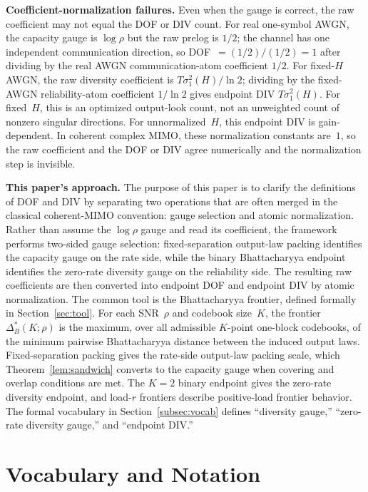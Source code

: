 \documentclass[lettersize,onecolumn]{IEEEtran}
\newcommand{\snr}{\rho}
\begin{document}
\textbf{Coefficient-normalization failures.}
Even when the gauge is correct, the raw coefficient may not equal the
DOF or DIV count. For real one-symbol AWGN, the capacity gauge is
$\log\snr$ but the raw prelog is $1/2$; the channel has one
independent communication direction, so DOF~$= (1/2)/(1/2) = 1$
after dividing by the real AWGN communication-atom coefficient $1/2$.
For fixed-$H$ AWGN, the raw diversity
coefficient is $T\sigma_1^2(H)/\ln 2$; dividing by the fixed-AWGN
reliability-atom coefficient $1/\ln 2$ gives endpoint DIV
$T\sigma_1^2(H)$. For fixed~$H$, this is an optimized output-look
count, not an unweighted count of nonzero singular directions. For
unnormalized~$H$, this endpoint DIV is gain-dependent.
In coherent complex MIMO, these normalization constants are~$1$, so
the raw coefficient and the DOF or DIV agree numerically and the
normalization step is invisible.

\textbf{This paper's approach.}
The purpose of this paper is to clarify the definitions of DOF and
DIV by separating two operations that are often merged in the
classical coherent-MIMO convention: gauge selection and atomic
normalization. Rather than assume the $\log\snr$ gauge and read its
coefficient, the framework performs two-sided gauge selection:
fixed-separation output-law packing identifies the capacity gauge on
the rate side, while the binary Bhattacharyya endpoint identifies the
zero-rate diversity gauge on the reliability side. The resulting raw
coefficients are then converted into endpoint DOF and endpoint DIV by
atomic normalization. The common tool is the Bhattacharyya frontier, defined formally in
Section~\ref{sec:tool}. For each SNR~$\snr$ and codebook
size~$K$, the frontier $\Delta_B^*(K;\snr)$ is the maximum, over all
admissible $K$-point one-block codebooks, of the minimum pairwise
Bhattacharyya distance between the induced output laws.
Fixed-separation packing gives the rate-side output-law packing
scale, which Theorem~\ref{lem:sandwich} converts to the capacity gauge
when covering and overlap conditions are met. The $K=2$ binary
endpoint gives the zero-rate diversity endpoint, and load-$r$
frontiers describe positive-load frontier behavior. The formal vocabulary in Section~\ref{subsec:vocab} defines
``diversity gauge,'' ``zero-rate diversity gauge,''
and ``endpoint DIV.''

\section{Vocabulary and Notation}\label{sec:vocab}
\end{document}
